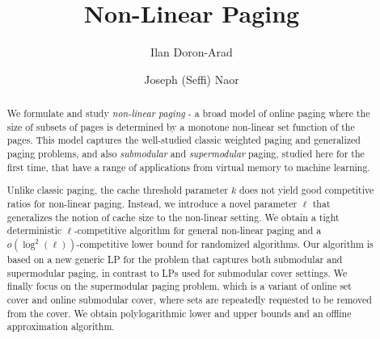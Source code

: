 \documentclass[11pt]{article}
\begin{document}
\newtheorem{thm}{Theorem}[section]
\newtheorem{prop}[thm]{Proposition}
\newtheorem{assm}[thm]{Assumption}
\newtheorem{lem}[thm]{Lemma}
\newtheorem{obs}[thm]{Observation}
\newtheorem{cor}[thm]{Corollary}
 \newtheorem{lemma}[thm]{Lemma}
  \newtheorem{definition}[thm]{Definition}
 \newtheorem{theorem}[thm]{Theorem}
 \newtheorem{proposition}[thm]{Proposition}
 \newtheorem{claim}[thm]{Claim}
\newtheorem{defn}[thm]{Definition}
\newcommand{\ariel}[1]{{\color{red} (Ariel :#1)}}
\def \II   {{\mathcal I}}
\newcommand{\one}{\mathbbm{1}}
	\def\claimproof{\proof}
\def\endclaimproof{\hfill$\square$\\}
\renewcommand\qedsymbol{$\blacksquare$}

\title{ {\bf Non-Linear Paging}}


\author{Ilan Doron-Arad \and Joseph (Seffi) Naor} %



\maketitle



\begin{abstract}
We formulate and study {\em non-linear paging} - a broad model of online paging where the size of subsets of pages is determined by a monotone non-linear set function of the pages. This model captures the well-studied classic weighted paging and generalized paging problems, and also {\em submodular} and {\em supermodular} paging, studied here for the first time, that have a range of applications from virtual memory to machine learning. 

Unlike classic paging, the cache threshold parameter $k$ does not yield good competitive ratios for non-linear paging. Instead, we introduce a novel parameter $\ell$ that generalizes the notion of cache size to the non-linear setting. We obtain a tight deterministic $\ell$-competitive algorithm for general non-linear paging and a $o\left(\log^2 (\ell)\right)$-competitive lower bound for randomized algorithms. Our algorithm is based on a new generic LP for the problem that captures both submodular and supermodular paging, in contrast to LPs used for submodular cover settings. 
We finally focus on the supermodular paging problem, which is a variant of online set cover and online submodular cover, where sets are repeatedly requested to be removed from the cover. We obtain  polylogarithmic lower and upper bounds and an offline approximation algorithm.  

\end{abstract}
\end{document}

